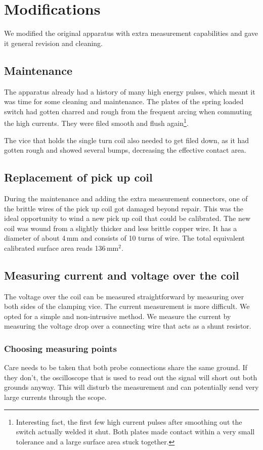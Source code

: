 \section{Modifications}
We modified the original apparatus with extra measurement capabilities and 
gave it general revision and cleaning.

\subsection{Maintenance}
The apparatus already had a history of many high energy pulses, which meant 
it was time for some cleaning and maintenance. The plates of the spring 
loaded switch had gotten charred and rough from the frequent arcing when 
commuting the high currents. They were filed smooth and flush 
again\footnote{Interesting fact, the first few high current pulses after 
smoothing out the switch actually welded it shut. Both plates made contact 
within a very small tolerance and a large surface area stuck together.}.

The vice that holds the single turn coil also needed to get filed down, as 
it had gotten rough and showed several bumps, decreasing the effective 
contact area.

\subsection{Replacement of pick up coil}
During the maintenance and adding the extra measurement connectors, one of 
the brittle wires of the pick up coil got damaged beyond repair. This was 
the ideal opportunity to wind a new pick up coil that could be calibrated. 
The new coil was wound from a slightly thicker and less brittle copper 
wire. It has a diameter of about 4\,mm and consists of 10 turns of wire. 
The total equivalent calibrated surface area reads 136\,mm$^2$.

\subsection{Measuring current and voltage over the coil}
The voltage over the coil can be measured straightforward by measuring over 
both sides of the clamping vice. The current measurement is more difficult.  
We opted for a simple and non-intrusive method. We measure the current by 
measuring the voltage drop over a connecting wire that acts as a shunt 
resistor.

\subsubsection{Choosing measuring points}
Care needs to be taken that both probe connections share the same ground.  
If they don't, the oscilloscope that is used to read out the signal will 
short out both grounds anyway. This will disturb the measurement and can 
potentially send very large currents through the scope.

